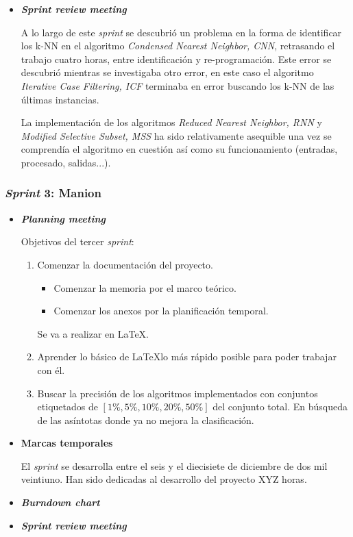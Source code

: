 \begin{itemize}
\item \textbf{\textit{Sprint review meeting}}

A lo largo de este \textit{sprint} se descubrió un problema en la forma de identificar los k-NN en el algoritmo \textit{Condensed Nearest Neighbor, CNN}\cite{hart1968condensed}, retrasando el trabajo cuatro horas, entre identificación y re-programación. Este error se descubrió mientras se investigaba otro error, en este caso el algoritmo \textit{Iterative Case Filtering, ICF}\cite{brighton2002advances} terminaba en error buscando los k-NN de las últimas instancias.

La implementación de los algoritmos \textit{Reduced Nearest Neighbor, RNN}\cite{gates1972reduced} y \textit{Modified Selective Subset, MSS}\cite{barandela2005decision} ha sido relativamente asequible una vez se comprendía el algoritmo en cuestión así como su funcionamiento (entradas, procesado, salidas...).
\end{itemize}

\subsubsection{\textit{Sprint} 3: Manion}
\begin{itemize}
\item \textbf{\textit{Planning meeting}}

Objetivos del tercer \textit{sprint}:
\begin{enumerate}
\item Comenzar la documentación del proyecto.
\begin{itemize}
\item Comenzar la memoria por el marco teórico.
\item Comenzar los anexos por la planificación temporal.
\end{itemize} 
Se va a realizar en \LaTeX.
\item Aprender lo básico de \LaTeX lo más rápido posible para poder trabajar con él.
\item Buscar la precisión de los algoritmos implementados con conjuntos etiquetados de $[1\%, 5\%, 10\%, 20\%, 50\%]$ del conjunto total. En búsqueda de las asíntotas donde ya no mejora la clasificación.
\end{enumerate}
\item \textbf{Marcas temporales}

El \textit{sprint} se desarrolla entre el seis y el diecisiete de diciembre de dos mil veintiuno. Han sido dedicadas al desarrollo del proyecto XYZ horas.

\item \textbf{\textit{Burndown chart}}

\item \textbf{\textit{Sprint review meeting}}

\end{itemize}


